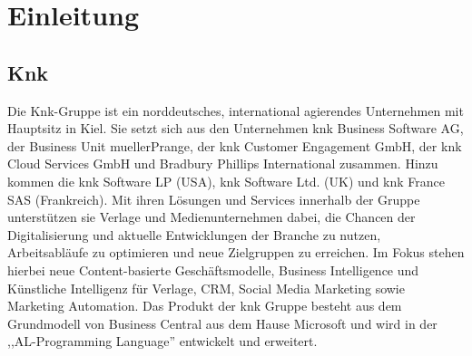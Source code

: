 \documentclass[12pt,bibtotoc]{article}
\begin{document}
	
	
	
	


	\section{Einleitung}
	\subsection{Knk}
	Die Knk-Gruppe ist ein norddeutsches, international agierendes Unternehmen mit Hauptsitz in Kiel. Sie setzt sich aus den Unternehmen knk Business Software AG, der Business Unit muellerPrange, der knk Customer Engagement GmbH, der knk Cloud Services GmbH und Bradbury Phillips International zusammen. Hinzu kommen die knk Software LP (USA), knk Software Ltd. (UK) und knk France SAS (Frankreich)\cite{knk-info.2023}.
	\newline \newline
	Mit ihren Lösungen und Services innerhalb der Gruppe unterstützen sie Verlage und Medienunternehmen dabei, die Chancen der Digitalisierung und aktuelle Entwicklungen der Branche zu nutzen, Arbeitsabläufe zu optimieren und neue Zielgruppen zu erreichen. Im Fokus stehen hierbei neue Content-basierte Geschäftsmodelle, Business Intelligence und Künstliche Intelligenz für Verlage, CRM, Social Media Marketing sowie Marketing Automation\cite{knk-info.2023}.
	Das Produkt der knk Gruppe besteht aus dem Grundmodell von Business Central aus dem Hause Microsoft und wird in der ,,AL-Programming Language'' entwickelt und erweitert.
\end{document}
